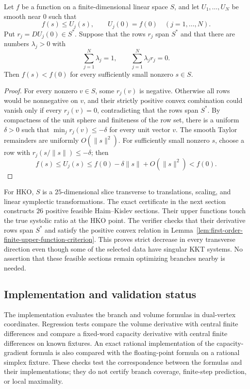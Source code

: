 \begin{lemma}
\label{lem:first-order-finite-upper-function-criterion}
Let \(f\) be a function on a finite-dimensional linear space \(S\), and let
\(U_1,\ldots,U_N\) be smooth near \(0\) such that
\[
  f(s)\leq U_j(s),
  \qquad U_j(0)=f(0)
  \quad(j=1,\ldots,N).
\]
Put \(r_j=DU_j(0)\in S^*\).  Suppose that the rows \(r_j\) span \(S^*\) and
that there are numbers \(\lambda_j>0\) with
\[
  \sum_{j=1}^N\lambda_j=1,
  \qquad
  \sum_{j=1}^N\lambda_jr_j=0.
\]
Then \(f(s)<f(0)\) for every sufficiently small nonzero \(s\in S\).
\end{lemma}

\begin{proof}
For every nonzero \(v\in S\), some \(r_j(v)\) is negative.  Otherwise all
rows would be nonnegative on \(v\), and their strictly positive convex
combination could vanish only if every \(r_j(v)=0\), contradicting that the
rows span \(S^*\).  By compactness of the unit sphere and finiteness of the
row set, there is a uniform \(\delta>0\) such that
\(\min_j r_j(v)\leq-\delta\) for every unit vector \(v\).  The smooth Taylor
remainders are uniformly \(O(\lVert s\rVert^2)\).  For sufficiently small
nonzero \(s\), choose a row with
\(r_j(s/\lVert s\rVert)\leq-\delta\); then
\[
  f(s)\leq U_j(s)
  \leq f(0)-\delta\lVert s\rVert+O(\lVert s\rVert^2)
  <f(0).
\]
\end{proof}

For HKO, \(S\) is a \(25\)-dimensional slice transverse to translations,
scaling, and linear symplectic transformations.  The exact certificate in the
next section constructs \(26\) positive feasible Haim--Kislev sections.  Their
upper functions touch the true systolic ratio at the HKO point.  The verifier
checks that their derivative rows span \(S^*\) and satisfy the positive convex
relation in Lemma~\ref{lem:first-order-finite-upper-function-criterion}.
This proves strict decrease in every transverse direction even though some of
the selected data have singular KKT systems.  No assertion that these
feasible sections remain optimizing branches nearby is needed.

\subsection{Implementation and validation status}
\label{subsec:first-order-validation}

The implementation evaluates the branch and volume formulas in dual-vertex
coordinates.  Regression tests compare the volume derivative with central
finite differences and compare a fixed-word capacity derivative with central
finite differences on known fixtures.  An exact rational implementation of
the capacity-gradient formula is also compared with the floating-point formula
on a rational simplex fixture.  These checks test the correspondence between
the formulas and their implementations; they do not certify branch coverage,
finite-step prediction, or local maximality.

